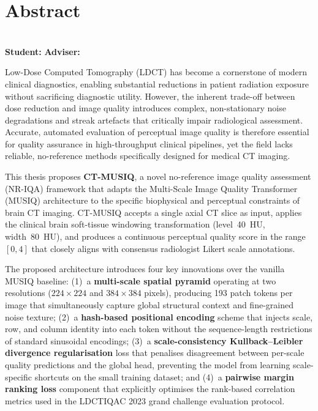 \chapter*{Abstract}

\noindent
\textbf{\thesismajor}\\[4pt]
\textbf{Student:} \thesisauthor \qquad \textbf{Adviser:} \thesisadviser

\vspace{1em}

Low-Dose Computed Tomography (LDCT) has become a cornerstone of modern clinical diagnostics,
enabling substantial reductions in patient radiation exposure without sacrificing diagnostic
utility. However, the inherent trade-off between dose reduction and image quality
introduces complex, non-stationary noise degradations and streak artefacts that critically
impair radiological assessment. Accurate, automated evaluation of perceptual image quality
is therefore essential for quality assurance in high-throughput clinical pipelines, yet
the field lacks reliable, no-reference methods specifically designed for medical CT imaging.

This thesis proposes \textbf{CT-MUSIQ}, a novel no-reference image quality assessment
(NR-IQA) framework that adapts the Multi-Scale Image Quality Transformer (MUSIQ)
architecture to the specific biophysical and perceptual constraints of brain CT imaging.
CT-MUSIQ accepts a single axial CT slice as input, applies the clinical brain soft-tissue
windowing transformation (level~40~HU, width~80~HU), and produces a continuous perceptual
quality score in the range~$[0,4]$ that closely aligns with consensus radiologist Likert
scale annotations.

The proposed architecture introduces four key innovations over the vanilla MUSIQ baseline:
(1)~a \textbf{multi-scale spatial pyramid} operating at two resolutions ($224 \times 224$
and $384 \times 384$ pixels), producing 193 patch tokens per image that simultaneously
capture global structural context and fine-grained noise texture; (2)~a
\textbf{hash-based positional encoding} scheme that injects scale, row, and column
identity into each token without the sequence-length restrictions of standard sinusoidal
encodings; (3)~a \textbf{scale-consistency Kullback--Leibler divergence regularisation}
loss that penalises disagreement between per-scale quality predictions and the global
head, preventing the model from learning scale-specific shortcuts on the small training
dataset; and (4)~a \textbf{pairwise margin ranking loss} component that explicitly
optimises the rank-based correlation metrics used in the LDCTIQAC 2023 grand challenge
evaluation protocol.

